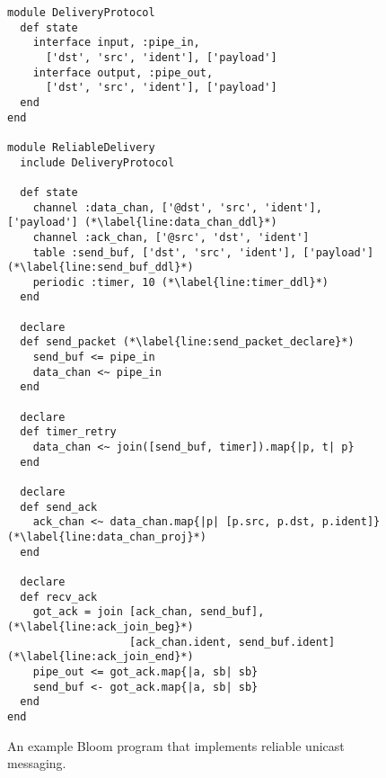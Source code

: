 \begin{figure}[t]
\begin{scriptsize}
\begin{lstlisting}
module DeliveryProtocol
  def state
    interface input, :pipe_in,
      ['dst', 'src', 'ident'], ['payload']
    interface output, :pipe_out,
      ['dst', 'src', 'ident'], ['payload']
  end
end

module ReliableDelivery
  include DeliveryProtocol

  def state
    channel :data_chan, ['@dst', 'src', 'ident'], ['payload'] (*\label{line:data_chan_ddl}*)
    channel :ack_chan, ['@src', 'dst', 'ident']
    table :send_buf, ['dst', 'src', 'ident'], ['payload'] (*\label{line:send_buf_ddl}*)
    periodic :timer, 10 (*\label{line:timer_ddl}*)
  end

  declare
  def send_packet (*\label{line:send_packet_declare}*)
    send_buf <= pipe_in
    data_chan <~ pipe_in
  end

  declare
  def timer_retry
    data_chan <~ join([send_buf, timer]).map{|p, t| p}
  end

  declare
  def send_ack
    ack_chan <~ data_chan.map{|p| [p.src, p.dst, p.ident]} (*\label{line:data_chan_proj}*)
  end

  declare
  def recv_ack
    got_ack = join [ack_chan, send_buf], (*\label{line:ack_join_beg}*)
                   [ack_chan.ident, send_buf.ident] (*\label{line:ack_join_end}*)
    pipe_out <= got_ack.map{|a, sb| sb}
    send_buf <- got_ack.map{|a, sb| sb}
  end
end
\end{lstlisting}
\centering
\vspace{-10pt}
\caption{An example Bloom program that implements reliable unicast messaging.}
\label{fig:bloom-example}
\end{scriptsize}
\vspace{-2pt}
\end{figure}

